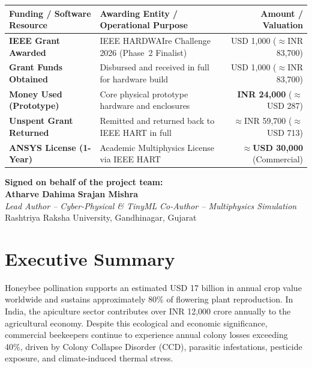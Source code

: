 \documentclass[12pt,a4paper]{article}
\begin{document}
{\vspace{0.25cm}
\noindent\begin{tabularx}{\textwidth}{p{4.2cm} X r}
\toprule
\textbf{Funding / Software Resource} & \textbf{Awarding Entity / Operational Purpose} & \textbf{Amount / Valuation} \\
\midrule
\textbf{IEEE Grant Awarded} & IEEE HARDWAIre Challenge 2026 (Phase~2 Finalist) & USD 1,000 ($\approx$INR 83,700) \\
\textbf{Grant Funds Obtained} & Disbursed and received in full for hardware build & USD 1,000 ($\approx$INR 83,700) \\
\textbf{Money Used (Prototype)} & Core physical prototype hardware and enclosures & \textbf{INR 24,000} ($\approx$USD 287) \\
\textbf{Unspent Grant Returned} & Remitted and returned back to IEEE HART in full & $\approx$INR 59,700 ($\approx$USD 713) \\
\midrule
\textbf{ANSYS License (\textbf{1-Year})} & Academic Multiphysics License via IEEE HART & $\approx$\textbf{USD 30,000} (Commercial) \\
\bottomrule
\end{tabularx}

\vspace{0.35cm}
\noindent\begin{minipage}{\textwidth}
\textbf{Signed on behalf of the project team:}\\[0.2cm]
\textbf{Atharve Dahima} \hfill \textbf{Srajan Mishra}\\
\textit{Lead Author -- Cyber-Physical \& TinyML} \hfill \textit{Co-Author -- Multiphysics Simulation}\\
Rashtriya Raksha University, Gandhinagar, Gujarat
\end{minipage}
}

\clearpage
\tableofcontents
\clearpage

\section{Executive Summary}

Honeybee pollination supports an estimated USD 17 billion in annual crop value worldwide and sustains approximately 80\% of flowering plant reproduction. In India, the apiculture sector contributes over INR 12,000 crore annually to the agricultural economy. Despite this ecological and economic significance, commercial beekeepers continue to experience annual colony losses exceeding 40\%, driven by Colony Collapse Disorder (CCD), parasitic infestations, pesticide exposure, and climate-induced thermal stress.
\end{document}
